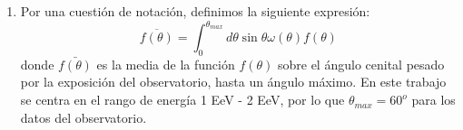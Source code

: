 \begin{enumerate}


    \item Por una cuestión de notación, definimos la siguiente expresión:
    \begin{equation}
        \overline{f(\theta)} = \int_{0}^{\theta_{max}} d\theta \sin\theta \omega(\theta) f(\theta)
        \label{eq:media_angular}
    \end{equation}
    \noindent donde $\bar{f(\theta)}$ es la media de la función $f(\theta)$ sobre el ángulo cenital pesado por la exposición del observatorio, hasta  un ángulo máximo. En este trabajo se centra en el rango de energía 1 EeV - 2 EeV, por lo que $\theta_{max}=60^o$ para los datos del observatorio. 


\end{enumerate}

